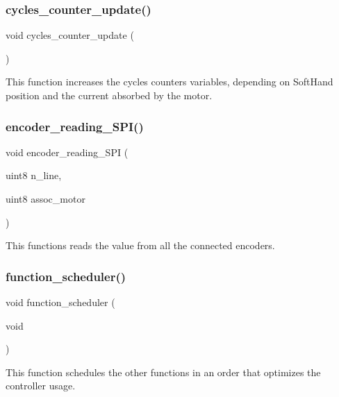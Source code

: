 \subsubsection{cycles\+\_\+counter\+\_\+update()}
{\footnotesize\ttfamily void cycles\+\_\+counter\+\_\+update (\begin{DoxyParamCaption}{ }\end{DoxyParamCaption})}

This function increases the cycles counters variables, depending on Soft\+Hand position and the current absorbed by the motor. \mbox{\label{interruptions_8c_a6eeedfdf03dd87bd2922b7005fd8c691}} 
\subsubsection{encoder\+\_\+reading\+\_\+\+S\+P\+I()}
{\footnotesize\ttfamily void encoder\+\_\+reading\+\_\+\+S\+PI (\begin{DoxyParamCaption}\item[{uint8}]{n\+\_\+line,  }\item[{uint8}]{assoc\+\_\+motor }\end{DoxyParamCaption})}

This functions reads the value from all the connected encoders. \mbox{\label{interruptions_8c_a39df971c4e9f194be50c54dfd7aeabfe}} 
\subsubsection{function\+\_\+scheduler()}
{\footnotesize\ttfamily void function\+\_\+scheduler (\begin{DoxyParamCaption}\item[{void}]{ }\end{DoxyParamCaption})}

This function schedules the other functions in an order that optimizes the controller usage. \mbox{\label{interruptions_8c_a9790811526002d99b25a814afd02cbae}} 
